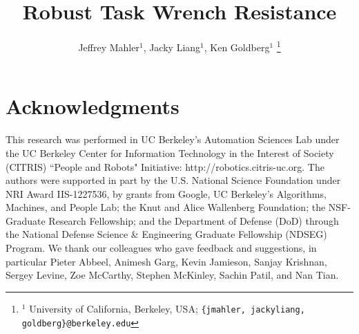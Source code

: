 \documentclass[letterpaper, 10 pt, conference]{ieeeconf}  %
\begin{document}
\title{\LARGE \bf Robust Task Wrench Resistance
	\vspace{-2ex}
	}
\author{Jeffrey Mahler$^1$, Jacky Liang$^1$, Ken Goldberg$^1$
\thanks{{\small $^1$ University of California, Berkeley, USA; {\tt\small \{jmahler, jackyliang, goldberg\}@berkeley.edu}}}%
}
\maketitle








\section{Acknowledgments}
{\footnotesize
This research was performed in UC Berkeley's Automation Sciences Lab under the UC Berkeley Center for Information Technology in the Interest of Society (CITRIS) ``People and Robots" Initiative: http://robotics.citris-uc.org.
The authors were supported in part by the U.S. National Science Foundation under NRI Award IIS-1227536, by grants from Google, UC Berkeley's Algorithms, Machines, and People Lab; the Knut and Alice Wallenberg Foundation; the NSF-Graduate Research Fellowship; and the Department of Defense (DoD) through the National Defense Science \& Engineering Graduate Fellowship (NDSEG) Program.
We thank our colleagues who gave feedback and suggestions, in particular Pieter Abbeel, Animesh Garg, Kevin Jamieson, Sanjay Krishnan, Sergey Levine, Zoe McCarthy, Stephen McKinley, Sachin Patil, and Nan Tian.
}



\end{document}
